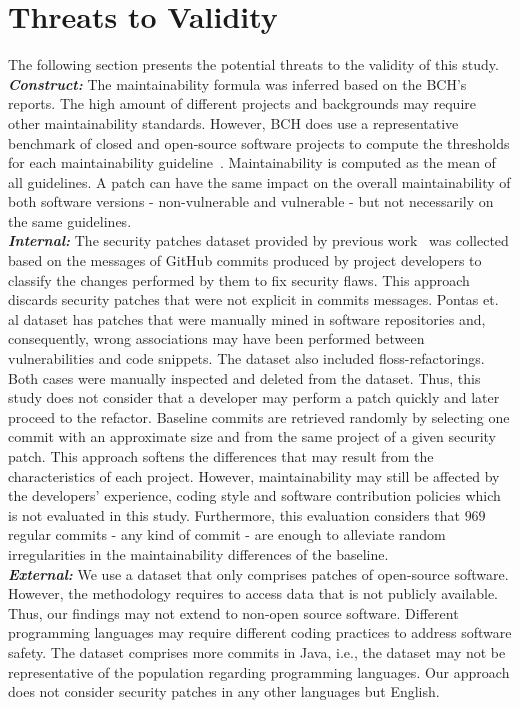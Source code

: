\documentclass[10pt,conference]{IEEEtran}
\begin{document}
\section{Threats to Validity}\label{sec:threats}
%
The following section presents the potential threats to the validity of this
study.
%
\\\textit{\textbf{Construct:}} The maintainability formula was inferred based 
on the BCH's reports. The high amount of different projects and backgrounds 
may require other maintainability standards. However, BCH does use a 
representative benchmark of closed and open-source software projects to compute 
the thresholds for each maintainability guideline~\cite{Visser:2016:OREILLY, Baggen2012}.
Maintainability is computed as the mean of all guidelines. A patch can
have the same impact on the overall maintainability of both software versions 
- non-vulnerable and vulnerable - but not necessarily on the same 
guidelines.
%
\\\textit{\textbf{Internal:}} The security patches dataset provided by previous
work~\cite{Reis:2017:IJSSE} was collected based on the messages of GitHub
commits produced by project developers to classify the changes performed by them
to fix security flaws. This approach discards security patches that were
not explicit in commits messages. Pontas et. al\cite{10.1109/MSR.2019.00064} dataset
has patches that were manually mined in software repositories and, consequently,
wrong associations may have been performed between vulnerabilities and code snippets. 
The dataset also included floss-refactorings. Both cases were manually inspected
and deleted from the dataset. Thus, this study does not consider that a
developer may perform a patch quickly and later proceed to the refactor.
Baseline commits are retrieved randomly by selecting one commit with an 
approximate size and from the same project of a given security patch. 
This approach softens the differences
that may result from the characteristics of each project. However,
maintainability may still be affected by the developers' experience, coding
style and software contribution policies which is not evaluated in this study.
Furthermore, this evaluation considers that $969$ regular commits - any kind
of commit - are enough to
alleviate random irregularities in the maintainability differences of the
baseline. 
\\\textit{\textbf{External:}} We use a dataset that only comprises patches of open-source software.
However, the methodology requires to access data that is not publicly available.
Thus, our findings may not extend to non-open source software. Different programming 
languages may require different coding practices to address software safety. The 
dataset comprises more commits in Java, i.e., the dataset may not be representative 
of the population regarding programming languages. Our approach does not consider 
security patches in any other languages but English.
\end{document}
